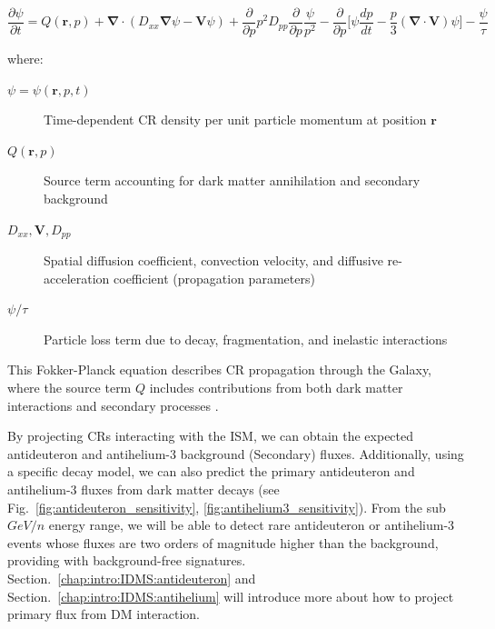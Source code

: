 \begin{equation}
    \frac{\partial\psi}{\partial t}=Q(\boldsymbol{r}, p)+\boldsymbol{\nabla}\cdot(D_{xx}\boldsymbol{\nabla}\psi-\boldsymbol{V}\psi)+\frac{\partial}{\partial p}p^2D_{pp}\frac{\partial}{\partial p}\frac{\psi}{p^2}-\frac{\partial}{\partial p}\bigg[\psi\frac{dp}{dt}-\frac{p}{3}(\boldsymbol{\nabla}\cdot\boldsymbol{V})\psi\bigg]-\frac{\psi}{\tau}
    \end{equation}

    \noindent where:
    \begin{description}
        \item[$\psi=\psi(\boldsymbol{r}, p, t)$] Time-dependent CR density per unit particle momentum at position $\boldsymbol{r}$
        \item[$Q(\boldsymbol{r}, p)$] Source term accounting for dark matter annihilation and secondary background
        \item[$D_{xx}, \boldsymbol{V}, D_{pp}$] Spatial diffusion coefficient, convection velocity, and diffusive re-acceleration coefficient (propagation parameters)
        \item[$\psi/\tau$] Particle loss term due to decay, fragmentation, and inelastic interactions
    \end{description}

    This Fokker-Planck equation describes CR propagation through the Galaxy, where the source term $Q$ includes contributions from both dark matter interactions and secondary processes \cite{PhysRevD.105.083021}.
    
By projecting \ac{CRs} interacting with the \ac{ISM}, we can obtain the expected antideuteron and antihelium-3  background (Secondary) fluxes. Additionally, using a specific decay model, we can also predict the primary antideuteron and antihelium-3 fluxes from dark matter decays (see Fig.~\ref{fig:antideuteron_sensitivity}, \ref{fig:antihelium3_sensitivity}). From the sub $GeV/n$ energy range, we will be able to detect rare antideuteron or antihelium-3 events whose fluxes are two orders of magnitude higher than the background, providing with background-free signatures. Section.~\ref{chap:intro:IDMS:antideuteron} and Section.~\ref{chap:intro:IDMS:antihelium} will introduce more about how to project primary flux from \ac{DM} interaction.

